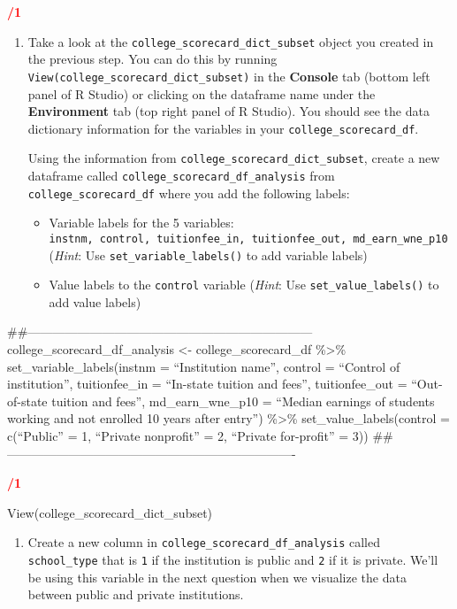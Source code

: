 \documentclass[
]{article}
\providecommand{\tightlist}{%
  \setlength{\itemsep}{0pt}\setlength{\parskip}{0pt}}
\begin{document}
\textcolor{red}{\textbf{/1}}

\begin{enumerate}
\def\labelenumi{\arabic{enumi}.}
\setcounter{enumi}{1}
\item
  Take a look at the \texttt{college\_scorecard\_dict\_subset} object
  you created in the previous step. You can do this by running
  \texttt{View(college\_scorecard\_dict\_subset)} in the
  \textbf{Console} tab (bottom left panel of R Studio) or clicking on
  the dataframe name under the \textbf{Environment} tab (top right panel
  of R Studio). You should see the data dictionary information for the
  variables in your \texttt{college\_scorecard\_df}.

  Using the information from \texttt{college\_scorecard\_dict\_subset},
  create a new dataframe called
  \texttt{college\_scorecard\_df\_analysis} from
  \texttt{college\_scorecard\_df} where you add the following labels:

  \begin{itemize}
  \tightlist
  \item
    Variable labels for the 5 variables:
    \texttt{instnm,\ control,\ tuitionfee\_in,\ tuitionfee\_out,\ md\_earn\_wne\_p10}
    (\emph{Hint}: Use \texttt{set\_variable\_labels()} to add variable
    labels)
  \item
    Value labels to the \texttt{control} variable (\emph{Hint}: Use
    \texttt{set\_value\_labels()} to add value labels)
  \end{itemize}
\end{enumerate}

\#\#---------------------------------------------------------------------
college\_scorecard\_df\_analysis \textless- college\_scorecard\_df
\%\textgreater\% set\_variable\_labels(instnm = ``Institution name'',
control = ``Control of institution'', tuitionfee\_in = ``In-state
tuition and fees'', tuitionfee\_out = ``Out-of-state tuition and fees'',
md\_earn\_wne\_p10 = ``Median earnings of students working and not
enrolled 10 years after entry'') \%\textgreater\%
set\_value\_labels(control = c(``Public'' = 1, ``Private nonprofit'' =
2, ``Private for-profit'' = 3))
\#\#----------------------------------------------------------------------

\textcolor{red}{\textbf{/1}}

View(college\_scorecard\_dict\_subset)

\begin{enumerate}
\def\labelenumi{\arabic{enumi}.}
\setcounter{enumi}{2}
\tightlist
\item
  Create a new column in \texttt{college\_scorecard\_df\_analysis}
  called \texttt{school\_type} that is \texttt{1} if the institution is
  public and \texttt{2} if it is private. We'll be using this variable
  in the next question when we visualize the data between public and
  private institutions.
\end{enumerate}
\end{document}
